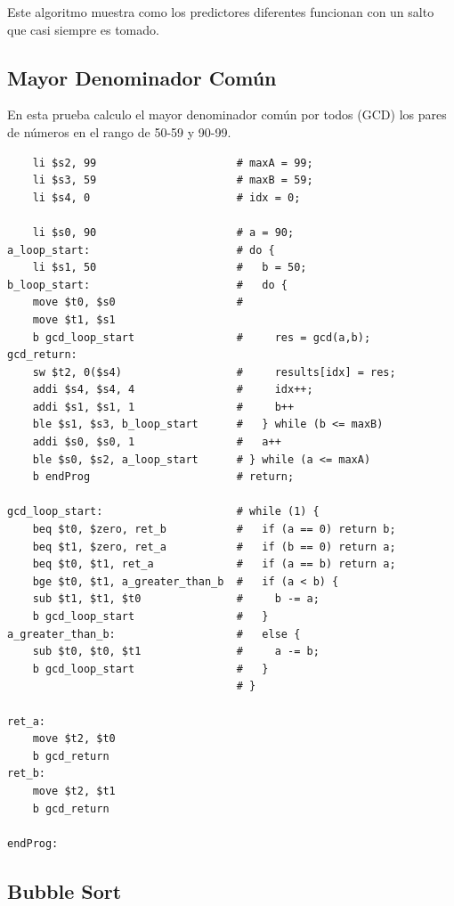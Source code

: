 \documentclass[a4paper]{article}
\begin{document}
Este algoritmo muestra como los predictores diferentes funcionan con un salto que casi siempre es tomado.

\subsection{Mayor Denominador Común}

En esta prueba calculo el mayor denominador común por todos (GCD) los pares de números en el rango de 50-59 y 90-99.

\begin{verbatim}
    li $s2, 99                      # maxA = 99;
    li $s3, 59                      # maxB = 59;
    li $s4, 0                       # idx = 0;

    li $s0, 90                      # a = 90;
a_loop_start:                       # do {
    li $s1, 50                      #   b = 50;
b_loop_start:                       #   do {
    move $t0, $s0                   #
    move $t1, $s1
    b gcd_loop_start                #     res = gcd(a,b);
gcd_return:
    sw $t2, 0($s4)                  #     results[idx] = res;
    addi $s4, $s4, 4                #     idx++;
    addi $s1, $s1, 1                #     b++
    ble $s1, $s3, b_loop_start      #   } while (b <= maxB)
    addi $s0, $s0, 1                #   a++
    ble $s0, $s2, a_loop_start      # } while (a <= maxA)
    b endProg                       # return;

gcd_loop_start:                     # while (1) {
    beq $t0, $zero, ret_b           #   if (a == 0) return b;
    beq $t1, $zero, ret_a           #   if (b == 0) return a;
    beq $t0, $t1, ret_a             #   if (a == b) return a;
    bge $t0, $t1, a_greater_than_b  #   if (a < b) {
    sub $t1, $t1, $t0               #     b -= a;
    b gcd_loop_start                #   }
a_greater_than_b:                   #   else {
    sub $t0, $t0, $t1               #     a -= b;
    b gcd_loop_start                #   }
                                    # }

ret_a:
    move $t2, $t0
    b gcd_return
ret_b:
    move $t2, $t1
    b gcd_return

endProg:
\end{verbatim}

\subsection{Bubble Sort}
\end{document}
